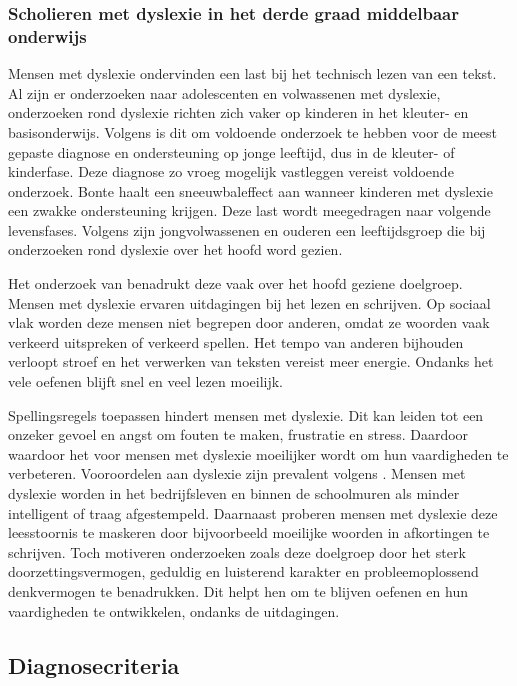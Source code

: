 \subsubsection{Scholieren met dyslexie in het derde graad middelbaar onderwijs}

Mensen met dyslexie ondervinden een last bij het technisch lezen van een tekst. Al zijn er onderzoeken naar adolescenten en volwassenen met dyslexie, onderzoeken rond dyslexie richten zich vaker op kinderen in het kleuter- en basisonderwijs. Volgens \textcite{Bonte2020} is dit om voldoende onderzoek te hebben voor de meest gepaste diagnose en ondersteuning op jonge leeftijd, dus in de kleuter- of kinderfase. Deze diagnose zo vroeg mogelijk vastleggen vereist voldoende onderzoek. Bonte haalt een sneeuwbaleffect aan wanneer kinderen met dyslexie een zwakke ondersteuning krijgen. Deze last wordt meegedragen naar volgende levensfases. Volgens \textcite{Lissens2020} zijn jongvolwassenen en ouderen een leeftijdsgroep die bij onderzoeken rond dyslexie over het hoofd word gezien.

Het onderzoek van \textcite{Lissens2020} benadrukt deze vaak over het hoofd geziene doelgroep. Mensen met dyslexie ervaren uitdagingen bij het lezen en schrijven. Op sociaal vlak worden deze mensen niet begrepen door anderen, omdat ze woorden vaak verkeerd uitspreken of verkeerd spellen. Het tempo van anderen bijhouden verloopt stroef en het verwerken van teksten vereist meer energie. Ondanks het vele oefenen blijft snel en veel lezen moeilijk. 

Spellingsregels toepassen hindert mensen met dyslexie. Dit kan leiden tot een onzeker gevoel en angst om fouten te maken, frustratie en stress. Daardoor waardoor het voor mensen met dyslexie moeilijker wordt om hun vaardigheden te verbeteren. Vooroordelen aan dyslexie zijn prevalent volgens \textcite{Diels2022}. Mensen met dyslexie worden in het bedrijfsleven en binnen de schoolmuren als minder intelligent of traag afgestempeld. Daarnaast proberen mensen met dyslexie deze leesstoornis te maskeren door bijvoorbeeld moeilijke woorden in afkortingen te schrijven. Toch motiveren onderzoeken zoals \textcite{Ghesquiere2018, Lissens2020, Bonte2020} deze doelgroep door het sterk doorzettingsvermogen, geduldig en luisterend karakter en probleemoplossend denkvermogen te benadrukken. Dit helpt hen om te blijven oefenen en hun vaardigheden te ontwikkelen, ondanks de uitdagingen.

\subsection{Diagnosecriteria}

